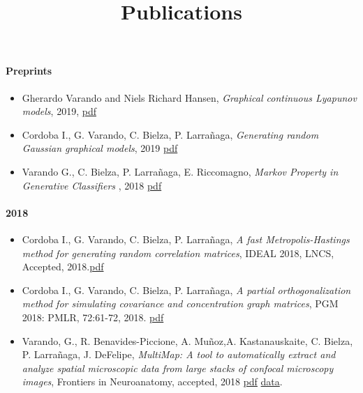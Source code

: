 \documentclass[]{article}
\title{Publications}
\date{}
\providecommand{\tightlist}{%
  \setlength{\itemsep}{0pt}\setlength{\parskip}{0pt}}
\let\oldparagraph\paragraph
\renewcommand{\paragraph}[1]{\oldparagraph{#1}\mbox{}}
\begin{document}
\maketitle

\hypertarget{preprints}{%
\paragraph{Preprints}\label{preprints}}

\begin{itemize}
\tightlist
\item
  Gherardo Varando and Niels Richard Hansen, \emph{Graphical continuous
  Lyapunov models}, 2019,
  \href{https://gherardovarando.github.io/pdf/varando19_preprint.pdf}{pdf}
\item
  Cordoba I., G. Varando, C. Bielza, P. Larrañaga, \emph{Generating
  random Gaussian graphical models}, 2019
  \href{https://arxiv.org/pdf/1909.01062.pdf}{pdf}
\item
  Varando G., C. Bielza, P. Larrañaga, E. Riccomagno, \emph{Markov
  Property in Generative Classifiers} , 2018
  \href{https://arxiv.org/pdf/1811.04759.pdf}{pdf}
\end{itemize}

\hypertarget{section}{%
\paragraph{2018}\label{section}}

\begin{itemize}
\tightlist
\item
  Cordoba I., G. Varando, C. Bielza, P. Larrañaga, \emph{A fast
  Metropolis-Hastings method for generating random correlation
  matrices}, IDEAL 2018, LNCS, Accepted,
  2018.\href{https://arxiv.org/pdf/1809.00351.pdf}{pdf}
\item
  Cordoba I., G. Varando, C. Bielza, P. Larrañaga, \emph{A partial
  orthogonalization method for simulating covariance and concentration
  graph matrices}, PGM 2018: PMLR, 72:61-72, 2018.
  \href{http://proceedings.mlr.press/v72/cordoba18a.pdf}{pdf}
\item
  Varando, G., R. Benavides-Piccione, A. Muñoz,A. Kastanauskaite, C.
  Bielza, P. Larrañaga, J. DeFelipe, \emph{MultiMap: A tool to
  automatically extract and analyze spatial microscopic data from large
  stacks of confocal microscopy images}, Frontiers in Neuroanatomy,
  accepted, 2018
  \href{https://www.frontiersin.org/articles/10.3389/fnana.2018.00037/pdf}{pdf}
  \textbar{} \href{https://data.broadinstitute.org/bbbc/BBBC044/}{data}.
\end{itemize}
\end{document}
